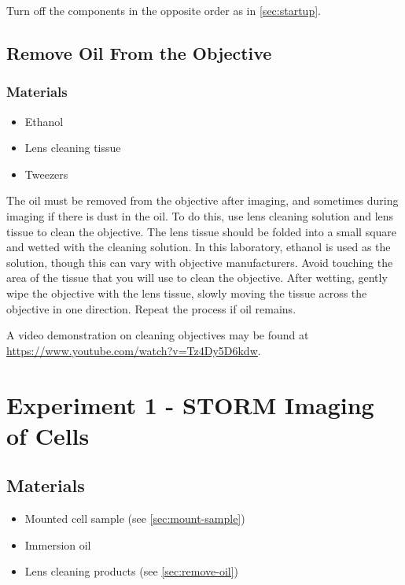 \documentclass[10pt,a4paper,oneside]{book}
\begin{document}
Turn off the components in the opposite order as in \autoref{sec:startup}.

\subsection{Remove Oil From the Objective}\label{sec:remove-oil}

\subsubsection{Materials}

\begin{itemize}
    \item{Ethanol}
    \item{Lens cleaning tissue}
    \item{Tweezers}
\end{itemize}

The oil must be removed from the objective after imaging, and sometimes during imaging if there is dust in the oil. To do this, use lens cleaning solution and lens tissue to clean the objective. The lens tissue should be folded into a small square and wetted with the cleaning solution. In this laboratory, ethanol is used as the solution, though this can vary with objective manufacturers. Avoid touching the area of the tissue that you will use to clean the objective. After wetting, gently wipe the objective with the lens tissue, slowly moving the tissue across the objective in one direction. Repeat the process if oil remains.

A video demonstration on cleaning objectives may be found at \url{https://www.youtube.com/watch?v=Tz4Dy5D6kdw}.

\section{Experiment 1 - STORM Imaging of Cells}

\subsection{Materials}

\begin{itemize}
    \item{Mounted cell sample (see \autoref{sec:mount-sample})}
    \item{Immersion oil}
    \item{Lens cleaning products (see \autoref{sec:remove-oil})}
\end{itemize}
\end{document}
